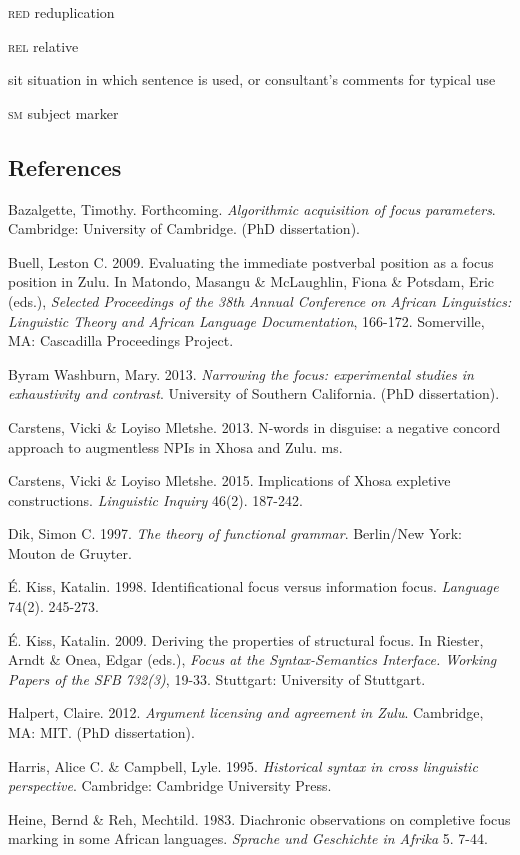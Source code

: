 \documentclass[output=paper]{langsci/langscibook}
\begin{document}
\textsc{red}  reduplication

\textsc{rel}  relative

sit  situation in which sentence is used, or consultant’s comments for typical use

\textsc{sm}  subject marker

\subsection{ References}

Bazalgette, Timothy. Forthcoming. \textit{Algorithmic acquisition of focus parameters}. Cambridge: University of Cambridge. (PhD dissertation).

Buell, Leston C. 2009. Evaluating the immediate postverbal position as a focus position in Zulu. In Matondo, Masangu \& McLaughlin, Fiona \& Potsdam, Eric (eds.), \textit{Selected Proceedings of the 38th Annual Conference on African Linguistics: Linguistic Theory and African Language Documentation}, 166-172. Somerville, MA: Cascadilla Proceedings Project.

Byram Washburn, Mary. 2013. \textit{Narrowing the focus: experimental studies in exhaustivity and contrast}. University of Southern California. (PhD dissertation).

Carstens, Vicki \& Loyiso Mletshe. 2013. N-words in disguise: a negative concord approach to augmentless NPIs in Xhosa and Zulu. ms.

Carstens, Vicki \& Loyiso Mletshe. 2015. Implications of Xhosa expletive constructions. \textit{Linguistic Inquiry} 46(2). 187-242.

Dik, Simon C. 1997. \textit{The theory of functional grammar}. Berlin/New York: Mouton de Gruyter.

É. Kiss, Katalin. 1998. Identificational focus versus information focus. \textit{Language} 74(2). 245-273.

É. Kiss, Katalin. 2009. Deriving the properties of structural focus. In Riester, Arndt \& Onea, Edgar (eds.), \textit{Focus at the Syntax-Semantics Interface. Working Papers of the SFB 732(3)}, 19-33. Stuttgart: University of Stuttgart.

Halpert, Claire. 2012. \textit{Argument licensing and agreement in Zulu}. Cambridge, MA: MIT. (PhD dissertation).

Harris, Alice C. \& Campbell, Lyle. 1995. \textit{Historical syntax in cross linguistic perspective}. Cambridge: Cambridge University Press.

Heine, Bernd \& Reh, Mechtild. 1983. Diachronic observations on completive focus marking in some African languages. \textit{Sprache und Geschichte in Afrika }5. 7-44.
\end{document}
